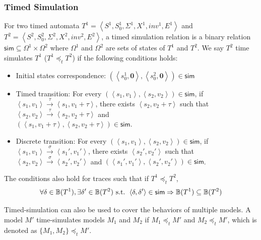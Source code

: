\subsubsection{Timed Simulation}
For two timed automata $T^1=\left\langle S^1,S_0^1,\Sigma^1,X^1,inv^1,E^1\right\rangle$ and $T^2=\left\langle S^2,S_0^2,\Sigma^2,X^2,inv^2,E^2\right\rangle$, a timed simulation relation is a binary relation $\textsf{sim}\subseteq \Omega^1\times \Omega^2$ where $\Omega^1$ and $\Omega^2$ are sets of states of $T^1$ and $T^2$. We say $T^2$ \textsf{time simulates} $T^1$ ($T^1 \preceq_t T^2$) if the following conditions holds:
\begin{itemize}
	\item Initial states correspondence: $(\left\langle s_0^1,\textbf{0}\right\rangle,\left\langle s_0^2,\textbf{0}\right\rangle)\in \textsf{sim}$
	\item Timed transition: For every $(\left\langle s_1,v_1\right\rangle,\left\langle s_2,v_2\right\rangle)\in\textsf{sim}$, if $\left\langle s_1,v_1\right\rangle\xrightarrow{\tau}\left\langle s_1,v_1+\tau\right\rangle$, there exists $\left\langle s_2,v_2+\tau\right\rangle$ such that $\left\langle s_2,v_2\right\rangle\xrightarrow{\tau}\left\langle s_2,v_2+\tau\right\rangle$ and \\$(\left\langle s_1,v_1+\tau\right\rangle,\left\langle s_2,v_2+\tau\right\rangle)\in\textsf{sim}$.
	\item Discrete transition: For every $(\left\langle s_1,v_1\right\rangle,\left\langle s_2,v_2\right\rangle)\in\textsf{sim}$, if $\left\langle s_1,v_1\right\rangle\xrightarrow{\sigma}\left\langle s_1',v_1'\right\rangle$, there exists $\left\langle s_2',v_2'\right\rangle$ such that $\left\langle s_2,v_2\right\rangle\xrightarrow{\sigma}\left\langle s_2',v_2'\right\rangle$ and $(\left\langle s_1',v_1'\right\rangle,\left\langle s_2',v_2'\right\rangle)\in\textsf{sim}$.
\end{itemize}
The conditions also hold for traces such that if $T^1 \preceq_t T^2$, 
$$\forall \delta\in\mathbb{B}{(T^1)},\exists \delta'\in\mathbb{B}{(T^2)}\text{ s.t. }\left\langle\delta,\delta'\right\rangle\in \textsf{sim}\Rightarrow \mathbb{B}{(T^1)}\subseteq\mathbb{B}{(T^2)}$$
\vspace{-15pt}

Timed-simulation can also be used to cover the behaviors of multiple models. 
A model $M'$ time-simulates models $M_1$ and $M_2$ if $M_1\preceq_t M'$ and $M_2\preceq_t M'$,
which is denoted as $\{M_1,M_2\}\preceq_t M'$.



